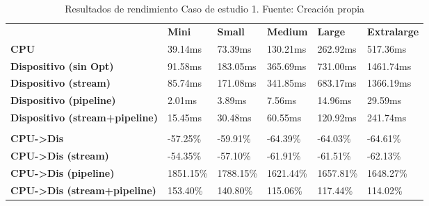 \begin{table}[H]
    \centering
    \begin{tabular}{llllll}
    \rowcolor[HTML]{DAE8FC} \ &  \textbf{Mini} &  \textbf{Small} &  \textbf{Medium} &  \textbf{Large} &  \textbf{Extralarge} \\
    \cellcolor[HTML]{DAE8FC} \textbf{CPU} & 39.14ms & 73.39ms & 130.21ms & 	262.92ms & 	517.36ms \\
    \rowcolor[HTML]{EFEFEF} \cellcolor[HTML]{DAE8FC} \textbf{Dispositivo (sin Opt)} & 91.58ms & 183.05ms & 365.69ms & 	731.00ms & 	1461.74ms \\
    \cellcolor[HTML]{DAE8FC} \textbf{Dispositivo (stream)} & 85.74ms & 171.08ms & 341.85ms & 	683.17ms & 	1366.19ms \\
    \rowcolor[HTML]{EFEFEF} \cellcolor[HTML]{DAE8FC} \textbf{Dispositivo (pipeline)} & 2.01ms & 3.89ms & 7.56ms & 	14.96ms & 	29.59ms \\
    \cellcolor[HTML]{DAE8FC} \textbf{Dispositivo (stream+pipeline)} & 15.45ms & 30.48ms & 60.55ms & 	120.92ms & 	241.74ms \\
    \rowcolor[HTML]{EFEFEF} \cellcolor[HTML]{DAE8FC} \textbf{\textbf{{\emph{{\underline{{}}}}}}} &  &  &  & 	 & 	 \\
    \cellcolor[HTML]{DAE8FC} \textbf{CPU->Dis} & -57.25\% & -59.91\% & -64.39\% & 	-64.03\% & 	-64.61\% \\
    \rowcolor[HTML]{EFEFEF} \cellcolor[HTML]{DAE8FC} \textbf{CPU->Dis (stream)} & -54.35\% & -57.10\% & -61.91\% & 	-61.51\% & 	-62.13\% \\
    \cellcolor[HTML]{DAE8FC} \textbf{CPU->Dis (pipeline)} & 1851.15\% & 1788.15\% & 1621.44\% & 	1657.81\% & 	1648.27\% \\
    \rowcolor[HTML]{EFEFEF} \cellcolor[HTML]{DAE8FC} \textbf{CPU->Dis (stream+pipeline)} & 153.40\% & 140.80\% & 115.06\% & 	117.44\% & 	114.02\% \\
    \end{tabular}
    \caption[Resultados de rendimiento Caso de estudio 1]{Resultados de rendimiento Caso de estudio 1. Fuente: Creación propia}
    \label{table_global_studyCase2_PerformanceResults}
\end{table}